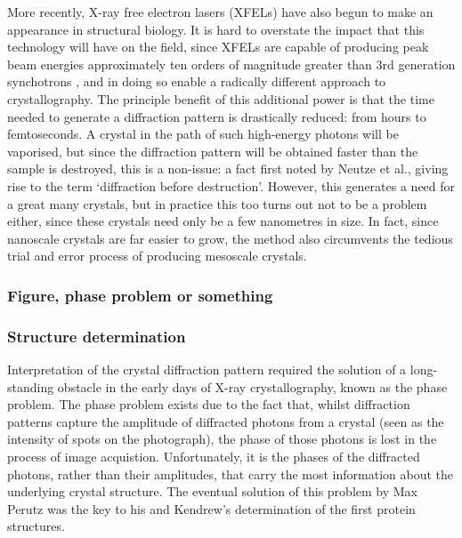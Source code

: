 \documentclass[a4paper,11pt,twoside,openright]{scrbook}
\let\cite\supercite
\begin{document}
More recently, X-ray free electron lasers (XFELs) have also begun to make an appearance in structural biology. It is hard to overstate the impact that this technology will have on the field, since XFELs are capable of producing peak beam energies approximately ten orders of magnitude greater than 3rd generation synchotrons \cite{Shi2014}, and in doing so enable a radically different approach to crystallography. The principle benefit of this additional power is that the time needed to generate a diffraction pattern is drastically reduced: from hours to femtoseconds. A crystal in the path of such high-energy photons will be vaporised, but since the diffraction pattern will be obtained faster than the sample is destroyed, this is a non-issue: a fact first noted by Neutze et al.\cite{Neutze2000}, giving rise to the term `diffraction before destruction'. However, this generates a need for a great many crystals, but in practice this too turns out not to be a problem either, since these crystals need only be a few nanometres in size. In fact, since nanoscale crystals are far easier to grow, the method also circumvents the tedious trial and error process of producing mesoscale crystals.

\subsubsection{Figure, phase problem or something}

\subsubsection{Structure determination}

Interpretation of the crystal diffraction pattern required the solution of a long-standing obstacle in the early days of X-ray crystallography, known as the phase problem. The phase problem exists due to the fact that, whilst diffraction patterns capture the amplitude of diffracted photons from a crystal (seen as the intensity of spots on the photograph), the phase of those photons is lost in the process of image acquistion. Unfortunately, it is the phases of the diffracted photons, rather than their amplitudes, that carry the most information about the underlying crystal structure. The eventual solution of this problem by Max Perutz was the key to his and Kendrew's determination of the first protein structures.
\end{document}
